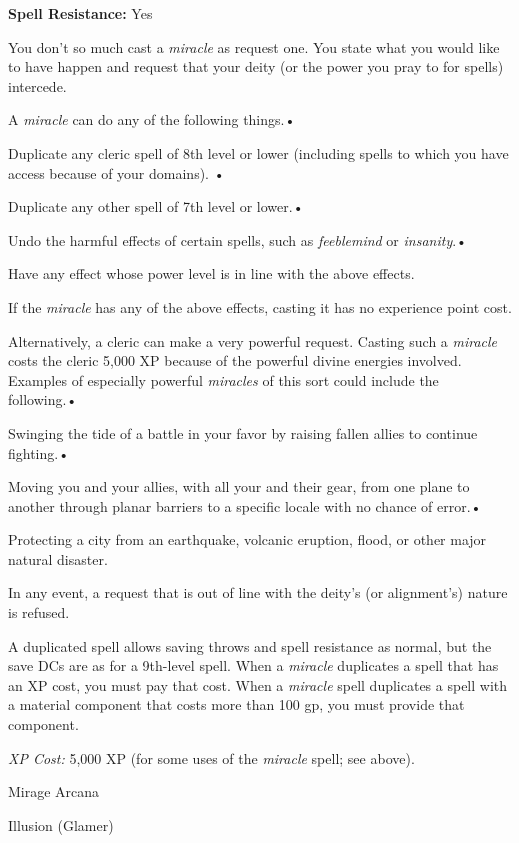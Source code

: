 \documentclass{article}
\begin{document}
\textbf{Spell Resistance:} Yes

You don't so much cast a \textit{miracle }as request one. You state what you would 
like to have happen and request that your deity (or the power you pray to for spells) 
intercede.

A \textit{miracle }can do any of the following things.• 

Duplicate any cleric spell of 8th level or lower (including spells to which you 
have access because of your domains). • 

Duplicate any other spell of 7th level or lower.• 

Undo the harmful effects of certain spells, such as \textit{feeblemind }or \textit{insanity}.• 

Have any effect whose power level is in line with the above effects.

If the \textit{miracle }has any of the above effects, casting it has no experience 
point cost.

Alternatively, a cleric can make a very powerful request. Casting such a \textit{miracle 
}costs the cleric 5,000 XP because of the powerful divine energies involved. Examples 
of especially powerful \textit{miracles }of this sort could include the following.• 

Swinging the tide of a battle in your favor by raising fallen allies to continue 
fighting.• 

Moving you and your allies, with all your and their gear, from one plane to another 
through planar barriers to a specific locale with no chance of error.• 

Protecting a city from an earthquake, volcanic eruption, flood, or other major 
natural disaster.

In any event, a request that is out of line with the deity's (or alignment's) nature 
is refused.

A duplicated spell allows saving throws and spell resistance as normal, but the 
save DCs are as for a 9th-level spell. When a \textit{miracle }duplicates a spell 
that has an XP cost, you must pay that cost. When a \textit{miracle }spell duplicates 
a spell with a material component that costs more than 100 gp, you must provide 
that component.

\textit{XP Cost: }5,000 XP (for some uses of the \textit{miracle }spell; see above).

\vspace{12pt}
Mirage Arcana

Illusion (Glamer)
\end{document}
